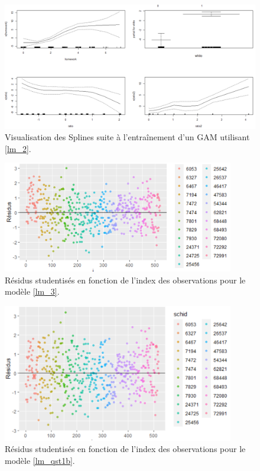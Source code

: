 \documentclass{article}
\begin{document}
\begin{figure}[H]  %
	\centering
	\includegraphics[width=1\textwidth]{graphiques/Splines2}
	\caption{Visualisation des Splines suite à l'entraînement d'un GAM utilisant \eqref{lm_2}.}
	\label{Spline_lm2}
\end{figure}

\begin{figure}[H]  %
	\centering
	\includegraphics[width=0.9\textwidth]{graphiques/residus_VS_id_qst1a}
	\caption{Résidus studentisés en fonction de l'index des observations pour le modèle \ref{lm_3}.}
	\label{residus_VS_id_qst1a}
\end{figure}

\begin{figure}[H]  %
	\centering
	\includegraphics[width=0.9\textwidth]{graphiques/residus_VS_id_qst1b}
	\caption{Résidus studentisés en fonction de l'index des observations pour le modèle \ref{lm_qst1b}.}
	\label{residus_VS_id_qst1b}
\end{figure}
\end{document}
